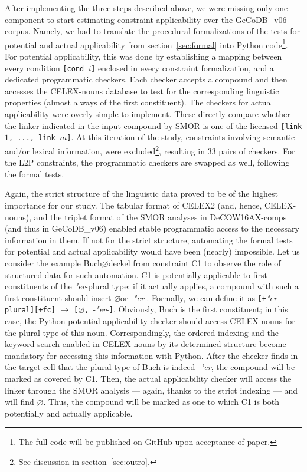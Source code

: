 \documentclass[10pt, a4paper]{article}
\newcommand{\zeroLinker}{\ensuremath{\boldsymbol{\varnothing}}}
\begin{document}
After implementing the three steps described above, we were missing only one component to start estimating constraint applicability over the GeCoDB\_v06 corpus. Namely, we had to translate the procedural formalizations of the tests for potential and actual applicability from section~\ref{sec:formal} into Python code\footnote{The full code will be published on GitHub upon acceptance of paper.}. For potential applicability, this was done by establishing a mapping between every condition \mbox{\texttt{[cond $i$]}} enclosed in every constraint formalization, and a dedicated programmatic checkers. Each checker accepts a compound and then accesses the CELEX-nouns database to test for the corresponding linguistic properties (almost always of the first constituent). The checkers for actual applicability were overly simple to implement. These directly compare whether the linker indicated in the input compound by SMOR is one of the licensed \mbox{\texttt{[link $1$, ..., link $m$]}}. At this iteration of the study, constraints involving semantic and/or lexical information, were excluded\footnote{See discussion in section~\ref{sec:outro}.}, resulting in 33 pairs of checkers. For the L2P constraints, the programmatic checkers are swapped as well, following the formal tests.

Again, the strict structure of the linguistic data proved to be of the highest importance for our study. The tabular format of CELEX2 (and, hence, CELEX-nouns), and the triplet format of the SMOR analyses in DeCOW16AX-comps (and thus in GeCoDB\_v06) enabled stable programmatic access to the necessary information in them. If not for the strict structure, automating the formal tests for potential and actual applicability would have been (nearly) impossible. Let us consider the example Buch{\zeroLinker}deckel from constraint C1 to observe the role of structured data for such automation. C1 is potentially applicable to first constituents of the \textit{"er}-plural type; if it actually applies, a compound with such a first constituent should insert \zeroLinker or -\textit{"er}-. Formally, we can define it as \mbox{\texttt{[+}\textit{"er}\texttt{ plural][+fc]}} $\rightarrow$ \mbox{\texttt{[}{\zeroLinker}\texttt{, }-\textit{"er}-\texttt{]}}. Obviously, Buch is the first constituent; in this case, the Python potential applicability checker should access CELEX-nouns for the plural type of this noun. Correspondingly, the ordered indexing and the keyword search enabled in CELEX-nouns by its determined structure become mandatory for accessing this information with Python. After the checker finds in the target cell that the plural type of Buch is indeed -\textit{"er}, the compound will be marked as covered by C1. Then, the actual applicability checker will access the linker through the SMOR analysis --- again, thanks to the strict indexing --- and will find \zeroLinker. Thus, the compound will be marked as one to which C1 is both potentially and actually applicable.
\end{document}
